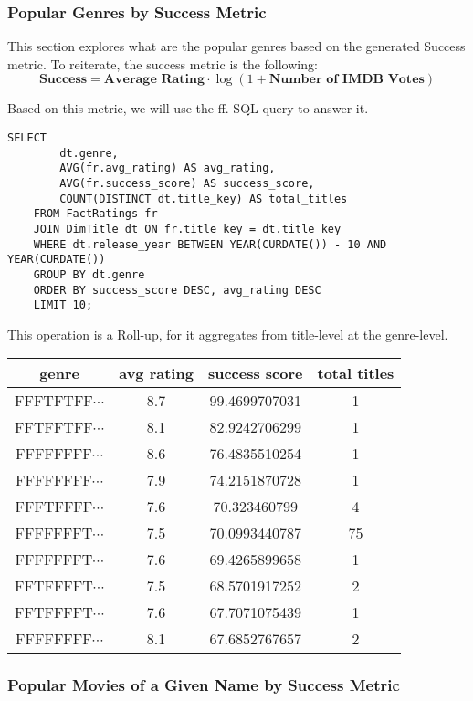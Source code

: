 \subsubsection{Popular Genres by Success Metric}

This section explores what are the popular genres based on the generated Success metric. To reiterate, the success metric is the following:
$$
\textbf{Success} = \textbf{Average Rating} \cdot \log(1 + \textbf{Number of IMDB Votes})
$$

Based on this metric, we will use the ff. SQL query to answer it.


\begin{lstlisting}[style=SQLStyle]
	SELECT 
		dt.genre,
		AVG(fr.avg_rating) AS avg_rating,
		AVG(fr.success_score) AS success_score,
		COUNT(DISTINCT dt.title_key) AS total_titles
	FROM FactRatings fr
	JOIN DimTitle dt ON fr.title_key = dt.title_key
	WHERE dt.release_year BETWEEN YEAR(CURDATE()) - 10 AND YEAR(CURDATE())
	GROUP BY dt.genre
	ORDER BY success_score DESC, avg_rating DESC
	LIMIT 10;
\end{lstlisting}

This operation is a Roll-up, for it aggregates from title-level at the genre-level.

\begin{center}
\begin{tabular}{|c|c|c|c|}
\hline
genre & avg rating & success score & total titles \\
\hline
FFFTFTFF$\cdots$ & 8.7 & 99.4699707031 & 1\\
FFTFFTFF$\cdots$ & 8.1 & 82.9242706299 & 1\\
FFFFFFFF$\cdots$ & 8.6 & 76.4835510254 & 1\\
FFFFFFFF$\cdots$ & 7.9 & 74.2151870728 & 1\\
FFFTFFFF$\cdots$ & 7.6 & 70.323460799 & 4\\
FFFFFFFT$\cdots$ & 7.5 & 70.0993440787 & 75\\
FFFFFFFT$\cdots$ & 7.6 & 69.4265899658 & 1\\
FFTFFFFT$\cdots$ & 7.5 & 68.5701917252 & 2\\
FFTFFFFT$\cdots$ & 7.6 & 67.7071075439 & 1\\
FFFFFFFF$\cdots$ & 8.1 & 67.6852767657 & 2\\
\hline
\end{tabular}
\end{center}

\subsubsection{Popular Movies of a Given Name by Success Metric}

